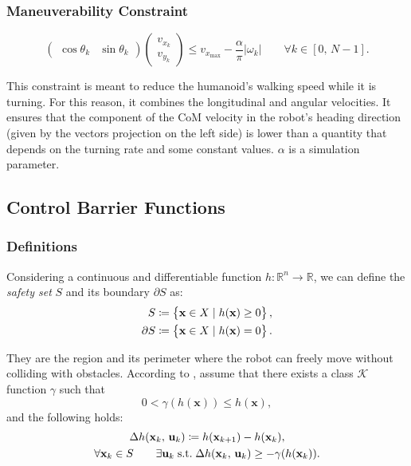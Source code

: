 \documentclass[main.tex]{subfiles}
\begin{document}
\subsubsection{Maneuverability Constraint}
\[
\begin{pmatrix}
\cos \theta_k & \sin \theta_k
\end{pmatrix}
\begin{pmatrix}
v_{x_k} \\
v_{y_k}
\end{pmatrix}
\leq v_{x_{\max}} - \frac{\alpha}{\pi} |\omega_k|
\qquad \forall k \in \left[0,\, N-1 \right].
\]

This constraint is meant to reduce the humanoid's walking speed while it is turning. For this reason, it combines the longitudinal and angular velocities. It ensures that the component of the CoM velocity in the robot's heading direction (given by the vectors projection on the left side) is lower than a quantity that depends on the turning rate and some constant values. $\alpha$ is a simulation parameter.

\subsection{Control Barrier Functions}

\subsubsection{Definitions}
Considering a continuous and differentiable function $h: \mathbb{R}^n \rightarrow \mathbb{R}$, we can define the \textit{safety set} $S$ and its boundary $\partial S$ as:
\begin{align*}
S \coloneqq \left\{ \mathbf{x} \in X \mid  h(\mathbf{x}) \geq 0\right\}, \notag \\
\partial S \coloneqq \left\{ \mathbf{x} \in X \mid  h(\mathbf{x}) = 0\right\}. \notag  \\
\end{align*}

They are the region and its perimeter where the robot can freely move without colliding with obstacles.
According to \cite{zeng2021safetycriticalmodelpredictivecontrol}, %
assume that there exists a class $\mathcal{K}$ function $\gamma$ such that
$$
0 < \gamma(h(\mathbf{x})) \leq h(\mathbf{x}),
$$
and the following holds:
\begin{gather}
\Delta h(\mathbf{x}_k,\, \mathbf{u}_k) \coloneqq h(\mathbf{x}_{k+1}) - h(\mathbf{x}_{k}), \notag \\
\forall \mathbf{x}_k \in S \qquad \exists \mathbf{u}_k \; \text{s.t.} \; \Delta h(\mathbf{x}_k,\, \mathbf{u}_k) \geq -\gamma(h(\mathbf{x}_k)). \label{eq:dcbf_def_constr}
\end{gather}
\end{document}
